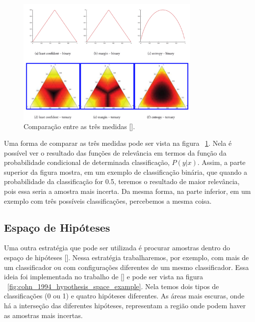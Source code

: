 \begin{figure}
  \centering
  \includegraphics[width=0.8\textwidth]{figures/settles_2014_uncertainty_medidas.png}
  \caption{Comparação entre as três medidas [\cite{settles2014active}].}
  \label{fig:settles_2014_uncertainty_medidas}
\end{figure}



Uma forma de comparar as três medidas pode ser vista na figura ~\ref{fig:settles_2014_uncertainty_medidas}. Nela é possível ver o resultado das funções de relevância em termos da função da probabilidade condicional de determinada classificação, $P(y\lvert x)$. Assim, a parte superior da figura mostra, em um exemplo de classificação binária, que quando a probabilidade da classificação for 0.5, teremos o resultado de maior relevância, pois essa seria a amostra mais incerta. Da mesma forma, na parte inferior, em um exemplo com três possíveis classificações, percebemos a mesma coisa. 


\subsection{Espaço de Hipóteses} 
\label{sec:hypothesis_space}

Uma outra estratégia que pode ser utilizada é procurar amostras dentro do espaço de hipóteses [\cite{mitchell1978version, mitchell1982generalization}]. Nessa estratégia trabalharemos, por exemplo, com mais de um classificador ou com configurações diferentes de um mesmo classificador. Essa ideia foi implementada no trabalho de [\cite{atlas1990training,cohn1994improving}] e pode ser vista na figura ~\ref{fig:cohn_1994_hypothesis_space_example}. Nela temos dois tipos de classificações (0 ou 1) e quatro hipóteses diferentes. As áreas mais escuras, onde há a interseção das diferentes hipóteses, representam a região onde podem haver as amostras mais incertas. 

